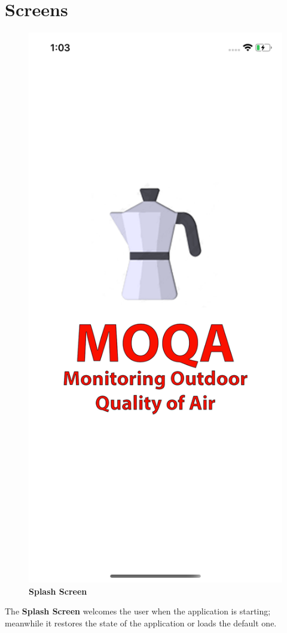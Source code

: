 \section{Screens}

\begin{figure}[H]
\centering
\includegraphics[height=.6\textheight]{./img/ui/splash.png}
\caption{\textbf{Splash Screen}}
\end{figure}
\begin{center}
The \textbf{Splash Screen} welcomes the user when the application is starting; meanwhile it restores the state of the application or loads the default one.    
\end{center}


